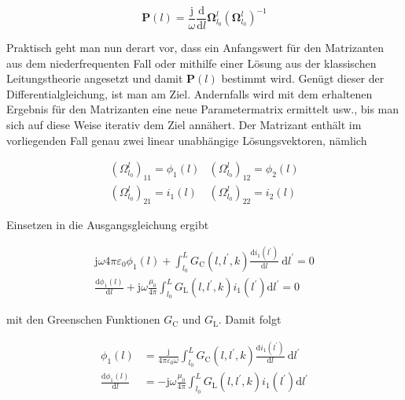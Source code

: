 \begin{equation}
	\mathbf{P}(l)=\frac{\mathrm{j}}{\omega} \frac{\mathrm{d}}{\mathrm{d} l} \boldsymbol{\Omega}_{l_{0}}^{l}\left(\boldsymbol{\Omega}_{l_{0}}^{l}\right)^{-1} 
\end{equation}


Praktisch geht man nun derart vor, dass ein Anfangswert für den Matrizanten aus dem niederfrequenten Fall oder mithilfe einer Lösung aus der klassischen Leitungstheorie angesetzt und damit $\mathbf{P}(l)$ bestimmt wird. Genügt dieser der Differentialgleichung, ist man am Ziel. Andernfalls wird mit dem erhaltenen Ergebnis für den Matrizanten eine neue Parametermatrix ermittelt usw., bis man sich auf diese Weise iterativ dem Ziel annähert. Der Matrizant enthält im vorliegenden Fall genau zwei linear unabhängige Lösungsvektoren, nämlich

\begin{equation}
	\begin{array}{ll}
		\left(\Omega_{l_{0}}^{l}\right)_{11}=\phi_{1}(l) & \left(\Omega_{l_{0}}^{l}\right)_{12}=\phi_{2}(l) \\
		\left(\Omega_{l_{0}}^{l}\right)_{21}=i_{1}(l) & \left(\Omega_{l_{0}}^{l}\right)_{22}=i_{2}(l) 
	\end{array}
\end{equation}

Einsetzen in die Ausgangsgleichung ergibt


\begin{align}
	\mathrm{j} \omega 4 \pi \varepsilon_{0} \phi_{1}(l)+\int_{l_{0}}^{L} G_{\mathrm{C}}\left(l, l^{\prime}, k\right) \frac{\mathrm{d} i_{1}\left(l^{\prime}\right)}{\mathrm{d} l} \mathrm{~d} l^{\prime}=0  \\
	\frac{\mathrm{d} \phi_{1}(l)}{\mathrm{d} l}+\mathrm{j} \omega \frac{\mu_{0}}{4 \pi} \int_{l_{0}}^{L} G_{\mathrm{L}}\left(l, l^{\prime}, k\right) i_{1}\left(l^{\prime}\right) \mathrm{d} l^{\prime}=0 
\end{align}


mit den Greenschen Funktionen $G_{\mathrm{C}}$ und $G_{\mathrm{L}}$. Damit folgt


\begin{align}
	\phi_{1}(l) & =\frac{\mathrm{j}}{4 \pi \varepsilon_{0} \omega} \int_{l_{0}}^{L} G_{\mathrm{C}}\left(l, l^{\prime}, k\right) \frac{\mathrm{d} i_{1}\left(l^{\prime}\right)}{\mathrm{d} l} \mathrm{~d} l^{\prime}  \\
	\frac{\mathrm{d} \phi_{1}(l)}{\mathrm{d} l} & =-\mathrm{j} \omega \frac{\mu_{0}}{4 \pi} \int_{l_{0}}^{L} G_{\mathrm{L}}\left(l, l^{\prime}, k\right) i_{1}\left(l^{\prime}\right) \mathrm{d} l^{\prime} 
\end{align}


